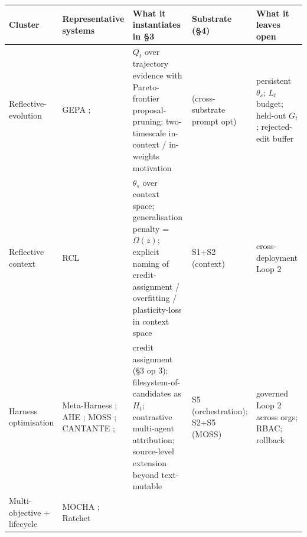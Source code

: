 {\def\LTcaptype{none} %
\begin{longtable}[]{@{}
  >{\raggedright\arraybackslash}p{}
  >{\raggedright\arraybackslash}p{}
  >{\raggedright\arraybackslash}p{}
  >{\raggedright\arraybackslash}p{}
  >{\raggedright\arraybackslash}p{}@{}}
\toprule\noalign{}
\begin{minipage}[b]{\linewidth}\raggedright
Cluster
\end{minipage} & \begin{minipage}[b]{\linewidth}\raggedright
Representative systems
\end{minipage} & \begin{minipage}[b]{\linewidth}\raggedright
What it instantiates in §3
\end{minipage} & \begin{minipage}[b]{\linewidth}\raggedright
Substrate (§4)
\end{minipage} & \begin{minipage}[b]{\linewidth}\raggedright
What it leaves open
\end{minipage} \\
\midrule\noalign{}
\endhead
\bottomrule\noalign{}
\endlastfoot
Reflective-evolution & GEPA \citep{agrawal2025gepa};
\citet{tiwari2026fastandslow} & \(Q_t\) over trajectory evidence with
Pareto-frontier proposal-pruning; two-timescale in-context / in-weights
motivation & (cross-substrate prompt opt) & persistent \(\theta_s\);
\(L_t\) budget; held-out \(G_t\); rejected-edit buffer \\
Reflective context & RCL \citep{vassilyev2026rcl} & \(\theta_s\) over
context space; generalisation penalty = \(\Omega(z)\); explicit naming
of credit-assignment / overfitting / plasticity-loss in context space &
S1+S2 (context) & cross-deployment Loop 2 \\
Harness optimisation & Meta-Harness \citep{lee2026metaharness}; AHE
\citep{lin2026ahe}; MOSS \citep{cai2026moss}; CANTANTE
\citep{zehle2026cantante}; \citet{ong2026harnesseval} & credit
assignment (§3 op 3); filesystem-of-candidates as \(H_t\); contrastive
multi-agent attribution; source-level extension beyond text-mutable & S5
(orchestration); S2+S5 (MOSS) & governed Loop 2 across orgs; RBAC;
rollback \\
Multi-objective + lifecycle & MOCHA \citep{tanjim2026mocha}; Ratchet

\end{longtable}}
